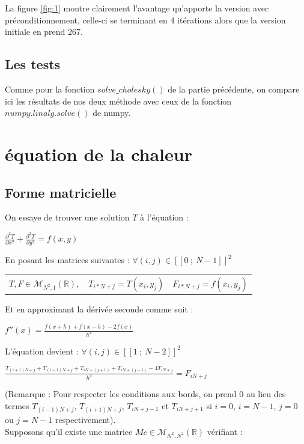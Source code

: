 \documentclass{article}
\begin{document}
La figure \ref{fig:1} montre clairement l'avantage qu'apporte la version avec pr\'econditionnement, celle-ci se terminant en 4 it\'erations alors que la version initiale en prend 267.

\subsection{Les tests}
Comme pour la fonction $solve\_cholesky()$ de la partie pr\'ec\'edente, on compare ici les r\'esultats de nos deux m\'ethode avec ceux de la fonction $numpy.linalg.solve()$ de numpy.
\section{\'equation de la chaleur}
\subsection{Forme matricielle}
On essaye de trouver une solution $T$ \`a l'\'equation :
\begin{center}
$\frac{\partial^2T}{\partial x^2} + \frac{\partial^2T}{\partial y^2} = f(x, y)$\\
\end{center}
En posant les matrices suivantes : $\forall(i,j) \in [\![ 0~;~ N-1 ]\!]^2$
\begin{center}
\begin{tabular}{l l l}
$T,F \in \mathcal{M}_{N^2, 1}(\mathbb{R}),$&$T_{i*N + j} = T(x_i, y_j)$&$F_{i*N + j} = f(x_i, y_j)$\\
\end{tabular}
\end{center}
Et en approximant la d\'eriv\'ee seconde comme suit :
\begin{center}
$f''(x) = \frac{f(x + h) + f(x - h) - 2f(x)}{h^2}$\\
\end{center}
L'\'equation devient : $\forall(i,j) \in [\![ 1~;~ N-2 ]\!]^2$
\begin{center}
$\frac{T_{(i+1)N + j} + T_{(i-1)N + j} + T_{iN + (j + 1)} + T_{iN + (j - 1)} - 4T_{iN + j}}{h^2} = F_{iN + j}$\\
\end{center}
(Remarque : Pour respecter les conditions aux bords, on prend 0 au lieu des termes $T_{(i-1)N + j}$, $T_{(i+1)N + j}$, $T_{iN + j-1}$ et $T_{iN + j+1}$ si $i = 0$, $i = N - 1$, $j = 0$ ou $j = N - 1$ respectivement).\\
Supposons qu'il existe une matrice $Mc \in \mathcal{M}_{N^2, N^2}(\mathbb{R})$ v\'erifiant :
\end{document}
